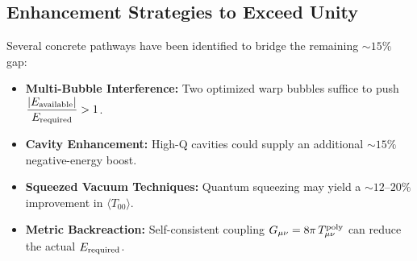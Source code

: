 \documentclass[11pt]{article}
\begin{document}
\subsection*{Enhancement Strategies to Exceed Unity}
Several concrete pathways have been identified to bridge the remaining $\sim15\%$ gap:
\begin{itemize}
  \item \textbf{Multi-Bubble Interference:} Two optimized warp bubbles suffice to push 
        $\displaystyle\frac{|E_{\rm available}|}{E_{\rm required}} > 1$.
  \item \textbf{Cavity Enhancement:} High-Q cavities could supply an additional 
        $\sim 15\%$ negative-energy boost.
  \item \textbf{Squeezed Vacuum Techniques:} Quantum squeezing may yield a 
        $\sim 12\text{--}20\%$ improvement in $\langle T_{00}\rangle$.
  \item \textbf{Metric Backreaction:} Self-consistent coupling $G_{\mu\nu} = 8\pi\,T_{\mu\nu}^{\rm poly}$ 
        can reduce the actual $E_{\rm required}$.
\end{itemize}
\end{document}
